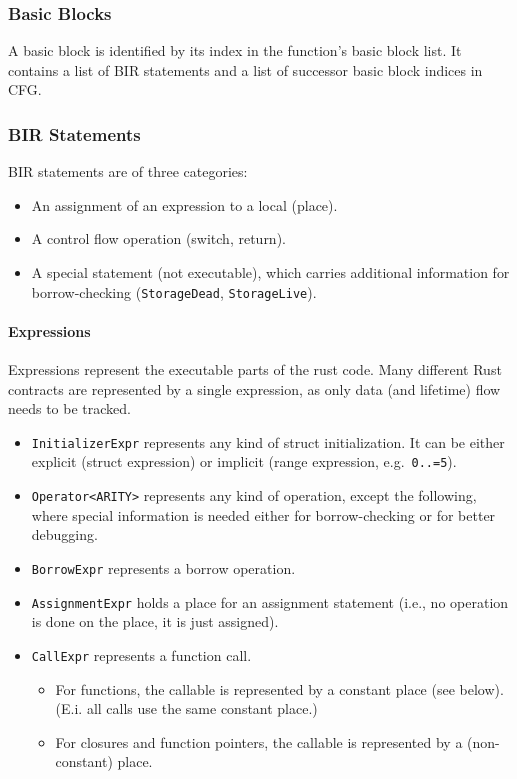 \hypertarget{basic-blocks}{%
\subsubsection{Basic Blocks}\label{basic-blocks}}

A basic block is identified by its index in the function's basic block
list. It contains a list of BIR statements and a list of successor basic
block indices in CFG.

\hypertarget{bir-statements}{%
\subsubsection{BIR Statements}\label{bir-statements}}

BIR statements are of three categories:

\begin{itemize}
\tightlist
\item
  An assignment of an expression to a local (place).
\item
  A control flow operation (switch, return).
\item
  A special statement (not executable), which carries additional
  information for borrow-checking (\texttt{StorageDead},
  \texttt{StorageLive}).
\end{itemize}

\hypertarget{expressions}{%
\paragraph{Expressions}\label{expressions}}

Expressions represent the executable parts of the rust code. Many
different Rust contracts are represented by a single expression, as only
data (and lifetime) flow needs to be tracked.

\begin{itemize}
\tightlist
\item
  \texttt{InitializerExpr} represents any kind of struct initialization.
  It can be either explicit (struct expression) or implicit (range
  expression, e.g.~\texttt{0..=5}).
\item
  \texttt{Operator\textless{}ARITY\textgreater{}} represents any kind of
  operation, except the following, where special information is needed
  either for borrow-checking or for better debugging.
\item
  \texttt{BorrowExpr} represents a borrow operation.
\item
  \texttt{AssignmentExpr} holds a place for an assignment statement
  (i.e., no operation is done on the place, it is just assigned).
\item
  \texttt{CallExpr} represents a function call.

  \begin{itemize}
  \tightlist
  \item
    For functions, the callable is represented by a constant place (see
    below). (E.i. all calls use the same constant place.)
  \item
    For closures and function pointers, the callable is represented by a
    (non-constant) place.
  \end{itemize}
\end{itemize}

